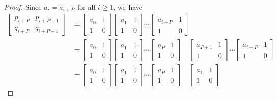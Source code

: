 \documentclass[12pt,reqno]{article}
\begin{document}
\begin{proof}
Since $a_i = a_{i+P}$ for all $i \geq 1$, we have
\begin{align*}
\left[ \begin{array}{cc} p_{i+P} & p_{i+P-1} \\ q_{i+P} & q_{i+P-1}  \end{array}\right] &=
\left[ \begin{array}{cc} a_0 & 1 \\ 1 & 0  \end{array} \right]
\left[ \begin{array}{cc} a_1 & 1 \\ 1 & 0  \end{array} \right]
\cdots
\left[ \begin{array}{cc} a_{i+P} & 1 \\ 1 & 0  \end{array} \right] \\
&=
\left[ \begin{array}{cc} a_0 & 1 \\ 1 & 0  \end{array} \right]
\left[ \begin{array}{cc} a_1 & 1 \\ 1 & 0  \end{array} \right]
\cdots
\left[ \begin{array}{cc} a_{P} & 1 \\ 1 & 0  \end{array} \right]  \quad
\left[ \begin{array}{cc} a_{P+1} & 1 \\ 1 & 0  \end{array} \right]
\cdots
\left[ \begin{array}{cc} a_{i+P} & 1 \\ 1 & 0  \end{array} \right] \\
&= \left[ \begin{array}{cc} a_0 & 1 \\ 1 & 0  \end{array} \right]
\left[ \begin{array}{cc} a_1 & 1 \\ 1 & 0  \end{array} \right]
\cdots
\left[ \begin{array}{cc} a_{P} & 1 \\ 1 & 0  \end{array} \right]  \quad
\left[ \begin{array}{cc} a_1 & 1 \\ 1 & 0  \end{array} \right]

\end{align*}
\end{proof}
\end{document}
